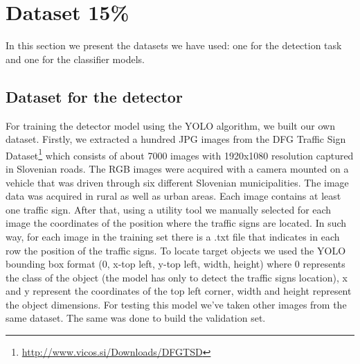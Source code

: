 \section{Dataset 15\%}

In this section we present the datasets we have used: one for the detection task and one for the classifier models. 

\subsection{Dataset for the detector}
For training the detector model using the YOLO algorithm, we built our own dataset. Firstly, we extracted a hundred JPG images from the DFG Traffic Sign Dataset\footnote{\url{http://www.vicos.si/Downloads/DFGTSD}} which consists of about 7000 images with 1920x1080 resolution captured in Slovenian roads. The RGB images were acquired with a camera mounted on a vehicle that was driven through six different Slovenian municipalities. The image data was acquired in rural as well as urban areas. Each image contains at least one traffic sign. After that, using a utility tool we manually selected for each image the coordinates of the position where the traffic signs are located. In such way, for each image in the training set there is a .txt file that indicates in each row the position of the traffic signs. To locate target objects we used the YOLO bounding box format (0, x-top left, y-top left, width, height) where 0 represents the class of the object (the model has only to detect the traffic signs location), x and y represent the coordinates of the top left corner, width and height represent the object dimensions. For testing this model we've taken other images from the same dataset. The same was done to build the validation set.


